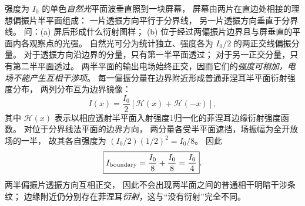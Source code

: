 强度为 $I_0$ 的单色\emph{自然光}平面波垂直照到一块屏幕，
屏幕由两片在直边处相接的理想偏振片半平面组成：
一片透振方向平行于分界线，
另一片透振方向垂直于分界线。
问：(a) 屏后形成什么衍射图样；
(b) 位于经过两偏振片边界且与屏垂直的平面内各观察点的光强。
\exsolution
自然光可分为统计独立、强度各为 $I_0/2$ 的两正交线偏振分量。
对于透振方向沿边界的分量，只有第一半平面透过；
对于另一正交分量，只有第二半平面透过。
两半平面的输出电场始终正交，因而它们的\emph{强度可相加，电场不能产生互相干涉项}。
每一偏振分量在边界附近形成普通菲涅耳半平面衍射强度分布，
两列分布互为边界镜像：
\[
\boxed{I(x)=\frac{I_0}{2}
\left[\mathcal H(x)+\mathcal H(-x)\right]},
\]
其中 $\mathcal H(x)$ 表示以相应透射半平面入射强度1归一化的菲涅耳边缘衍射强度函数。
对位于分界线法平面的边界方向，
两分量各受半平面遮挡，场振幅为全开放场的一半，
故其各自强度为
$(I_0/2)(1/2)^2=I_0/8$。
因此
\[
\boxed{I_{\rm boundary}=
\frac{I_0}{8}+\frac{I_0}{8}
=\frac{I_0}{4}}.
\]
\excheck 两半偏振片透振方向互相正交，
因此不会出现两半面之间的普通相干明暗干涉条纹；
边缘附近仍分别存在菲涅耳\emph{衍射}，这与“没有衍射”完全不同。
